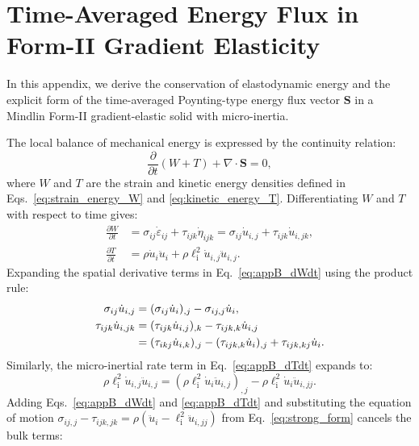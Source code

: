 \section{Time-Averaged Energy Flux in Form-II Gradient Elasticity}
\label{app:energy_flux}

In this appendix, we derive the conservation of elastodynamic energy and the explicit form of the time-averaged Poynting-type energy flux vector $\bm{S}$ in a Mindlin Form-II gradient-elastic solid with micro-inertia.

The local balance of mechanical energy is expressed by the continuity relation:
\begin{equation}
\frac{\partial}{\partial t}(W + T) + \nabla \cdot \bm{S} = 0,
\label{eq:appB_poynting_theorem}
\end{equation}
where $W$ and $T$ are the strain and kinetic energy densities defined in Eqs.~\eqref{eq:strain_energy_W} and \eqref{eq:kinetic_energy_T}. Differentiating $W$ and $T$ with respect to time gives:
\begin{align}
\frac{\partial W}{\partial t} &= \sigma_{ij} \dot{\varepsilon}_{ij} + \tau_{ijk} \dot{\eta}_{ijk} = \sigma_{ij} \dot{u}_{i,j} + \tau_{ijk} \dot{u}_{i,jk}, \label{eq:appB_dWdt} \\
\frac{\partial T}{\partial t} &= \rho \dot{u}_i \ddot{u}_i + \rho \ell_{\mathrm{i}}^2 \dot{u}_{i,j} \ddot{u}_{i,j}. \label{eq:appB_dTdt}
\end{align}
Expanding the spatial derivative terms in Eq.~\eqref{eq:appB_dWdt} using the product rule:
\begin{align}
\sigma_{ij} \dot{u}_{i,j} &= (\sigma_{ij} \dot{u}_i)_{,j} - \sigma_{ij,j} \dot{u}_i, \label{eq:appB_id1} \\
\tau_{ijk} \dot{u}_{i,jk} &= (\tau_{ijk} \dot{u}_{i,j})_{,k} - \tau_{ijk,k} \dot{u}_{i,j} \notag \\
&= (\tau_{ikj} \dot{u}_{i,k})_{,j} - (\tau_{ijk,k} \dot{u}_i)_{,j} + \tau_{ijk,kj} \dot{u}_i. \label{eq:appB_id2}
\end{align}
Similarly, the micro-inertial rate term in Eq.~\eqref{eq:appB_dTdt} expands to:
\begin{equation}
\rho \ell_{\mathrm{i}}^2 \dot{u}_{i,j} \ddot{u}_{i,j} = (\rho \ell_{\mathrm{i}}^2 \dot{u}_i \ddot{u}_{i,j})_{,j} - \rho \ell_{\mathrm{i}}^2 \dot{u}_i \ddot{u}_{i,jj}.
\label{eq:appB_id3}
\end{equation}
Adding Eqs.~\eqref{eq:appB_dWdt} and \eqref{eq:appB_dTdt} and substituting the equation of motion $\sigma_{ij,j} - \tau_{ijk,jk} = \rho(\ddot{u}_i - \ell_{\mathrm{i}}^2 \ddot{u}_{i,jj})$ from Eq.~\eqref{eq:strong_form} cancels the bulk terms:
